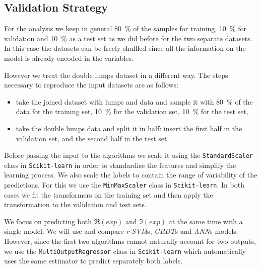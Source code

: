 \subsection{Validation Strategy}

For the analysis we keep in general \SI{80}{\percent} of the samples for training, \SI{10}{\percent} for validation and \SI{10}{\percent} as a test set as we did before for the two separate datasets.
In this case the datasets can be freely shuffled since all the information on the model is already encoded in the variables.\footnotemark{}

However we treat the double lumps dataset in a different way.
The steps necessary to reproduce the input datasets are as follows:
\begin{itemize}
  \item take the joined dataset with lumps and \wzw data and sample it with \SI{80}{\percent} of the data for the training set, \SI{10}{\percent} for the validation set, \SI{10}{\percent} for the test set,
  
  \item take the double lumps data and split it in half: insert the first half in the validation set, and the second half in the test set.
\end{itemize}

Before passing the input to the algorithms we scale it using the \texttt{StandardScaler} class in \texttt{Scikit-learn} in order to standardise the features and simplify the learning process.
We also scale the labels to contain the range of variability of the predictions.\footnotemark{}
For this we use the \texttt{MinMaxScaler} class in \texttt{Scikit-learn}.
In both cases we fit the transformers on the training set and then apply the transformation to the validation and test sets.\footnotemark{}

We focus on predicting both $\Re(exp)$ and $\Im(exp)$ at the same time with a single model.
We will use and compare \emph{r-SVM}s, \emph{GBDT}s and \emph{ANN}s models.
However, since the first two algorithms cannot naturally account for two outputs, we use the \texttt{MultiOutputRegressor} class in \texttt{Scikit-learn} which automatically uses the same estimator to predict separately both labels.


